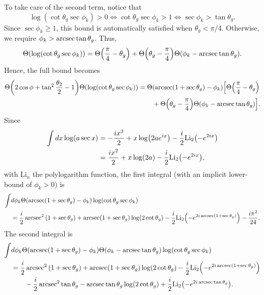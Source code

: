 \documentclass[11pt,twoside,reqno]{amsart}
\theoremstyle{plain}
\theoremstyle{remark}
\theoremstyle{definition}
\theoremstyle{remark}
\theoremstyle{definition}
\theoremstyle{definition}
\newcommand{\Li}{\mathrm{Li}}
\begin{document}
	To take care of the second term, notice that
	\begin{equation}
		\log(\cot\theta_g\sec\phi_k) > 0 \iff \cot\theta_g \sec\phi_k > 1 \iff \sec\phi_k > \tan\theta_g.
	\end{equation}
	Since $\sec\phi_k \ge 1$, this bound is automatically satisfied when $\theta_g < \pi/4$. Otherwise, we require $\phi_k > \arcsec\tan\theta_g$. Thus,
	\begin{equation}
		\Theta\qty(\log(\cot\theta_g \sec\phi_k)) = \Theta\qty(\frac{\pi}{4} - \theta_g) + \Theta\qty(\theta_g - \frac{\pi}{4})\Theta\qty(\phi_k - \arcsec\tan\theta_g).
	\end{equation}
	Hence, the full bound becomes
	\begin{equation}
	\begin{aligned}
		\Theta\qty(2\cos\phi + \tan^2\frac{\theta_2}{2} - 1)\Theta\qty(\log(\cot\theta_g \sec\phi_k)) = \Theta&(\arcsec(1 + \sec\theta_g) - \phi_k) \Big[ \Theta\qty(\frac{\pi}{4} - \theta_g) \\
		&+ \Theta\qty(\theta_g - \frac{\pi}{4})\Theta\qty(\phi_k - \arcsec\tan\theta_g) \Big].
	\end{aligned}
	\end{equation}
	Since
	\begin{equation}
	\begin{aligned}
		\int dx \log(a \sec x) &= -\frac{i x^2}{2} + x \log(2 a e^{ix}) - \frac{i}{2}\Li_2\qty(-e^{2ix}) \\
		&= \frac{i x^2}{2} + x\log(2a) - \frac{i}{2}\Li_2\qty(-e^{2ix}),
	\end{aligned}
	\end{equation}
	with $\Li_n$ the polylogarithm function, the first integral (with an implicit lower-bound of $\phi_k > 0$) is
	\begin{equation}
	\begin{aligned}
		\int &d\phi_k \Theta(\arcsec(1 + \sec\theta_g) - \phi_k) \log(\cot\theta_g \sec\phi_k) \\
		&= \frac{i}{2}\arcsec^2\qty(1 + \sec\theta_g) + \arcsec(1 + \sec\theta_g)\log(2\cot\theta_g) - \frac{i}{2}\Li_2\qty(-e^{2i\arcsec(1+\sec\theta_g)}) - \frac{i\pi^2}{24}.
	\end{aligned}
	\end{equation}
	The second integral is
	\begin{equation}
	\begin{aligned}
		\int &d\phi_k \Theta(\arcsec(1 + \sec\theta_g) - \phi_k) \Theta\qty(\phi_k - \arcsec\tan\theta_g) \log(\cot\theta_g \sec\phi_k) \\
		&= \frac{i}{2}\arcsec^2\qty(1 + \sec\theta_g) + \arcsec(1 + \sec\theta_g)\log(2\cot\theta_g) - \frac{i}{2}\Li_2\qty(-e^{2i\arcsec(1+\sec\theta_g)}) \\
			&\qquad - \frac{i}{2}\arcsec^2\tan\theta_g - \arcsec\tan\theta_g \log(2\cot\theta_g) + \frac{i}{2}\Li_2\qty(-e^{2i\arcsec\tan\theta_g}).
	\end{aligned}
	\end{equation}
\end{document}
